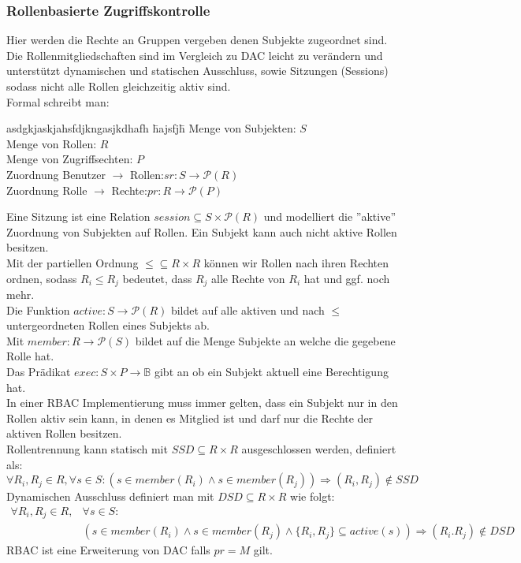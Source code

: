 \documentclass[a4paper,12pt,leqno]{article}
\begin{document}
\subsubsection{Rollenbasierte Zugriffskontrolle}
Hier werden die Rechte an Gruppen vergeben denen Subjekte zugeordnet sind.
Die Rollenmitgliedschaften sind im Vergleich zu DAC leicht zu verändern und unterstützt dynamischen und statischen Ausschluss, sowie Sitzungen (Sessions) sodass nicht alle Rollen gleichzeitig aktiv sind.\\
Formal schreibt man:
\begin{tabbing}
asdgkjaskjahsfdjkngasjkdhafh             \= hajsfjh\=\kill
Menge von Subjekten: \> \>   $S$\\
Menge von Rollen: \>   \>    $R$\\
Menge von Zugriffsechten: \>\>$P$\\
Zuordnung Benutzer $\rightarrow$ Rollen:\>\>$sr: S\rightarrow \mathcal{P}(R)$\\
Zuordnung Rolle $\rightarrow$ Rechte:\>\>$pr: R\rightarrow \mathcal{P}(P)$
\end{tabbing}
Eine Sitzung ist eine Relation $session\subseteq S\times \mathcal{P}(R)$ und modelliert die ''aktive'' Zuordnung von Subjekten auf Rollen. Ein Subjekt kann auch nicht aktive Rollen besitzen.\\
Mit der partiellen Ordnung $\leq\subseteq R\times R$ können wir Rollen nach ihren Rechten ordnen, sodass $R_i\leq R_j$ bedeutet, dass $R_j$ alle Rechte von $R_i$ hat und ggf. noch mehr.\\

Die Funktion $active: S\rightarrow \mathcal{P}(R)$ bildet auf alle aktiven und nach $\leq$ untergeordneten Rollen eines Subjekts ab.\\
Mit $member: R\rightarrow \mathcal{P}(S)$ bildet auf die Menge Subjekte an welche die gegebene Rolle hat.\\
Das Prädikat $exec: S\times P\rightarrow \mathbb{B}$ gibt an ob ein Subjekt aktuell eine Berechtigung hat.\\

In einer RBAC Implementierung muss immer gelten, dass ein Subjekt nur in den Rollen aktiv sein kann, in denen es Mitglied ist und darf nur die Rechte der aktiven Rollen besitzen.\\

Rollentrennung kann statisch mit $SSD\subseteq R\times R$ ausgeschlossen werden, definiert als: $$\forall R_i,R_j\in R,\forall s\in S :\left(s\in member(R_i)\wedge s\in member(R_j)\right)\Rightarrow (R_i,R_j)\not\in SSD$$
Dynamischen Ausschluss definiert man mit $DSD\subseteq R\times R$ wie folgt:
\begin{align*}
\forall R_i,R_j\in R,&\forall s\in S :\\
&(s\in member(R_i)\wedge s\in member(R_j)\wedge \{R_i,R_j\}\subseteq active(s))\Rightarrow (R_i.R_j)\not\in DSD
\end{align*}
RBAC ist eine Erweiterung von DAC falls $pr=M$ gilt. 
\end{document}
